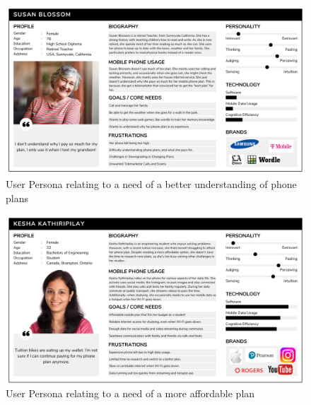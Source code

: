 \documentclass[conference]{IEEEtran}
\begin{document}
\begin{figure}[H]
    \centering
    \includegraphics[width=1\linewidth]{persona_susanblossom.png}
    \caption{User Persona relating to a need of a better understanding of phone plans}
    \label{fig:user persona 2}
\end{figure}

\begin{figure}[H]
    \centering
    \includegraphics[width=1\linewidth]{persona_keshakath.png}
    \caption{User Persona relating to a need of a more affordable plan}
    \label{fig:user persona 3}
\end{figure}
\end{document}
